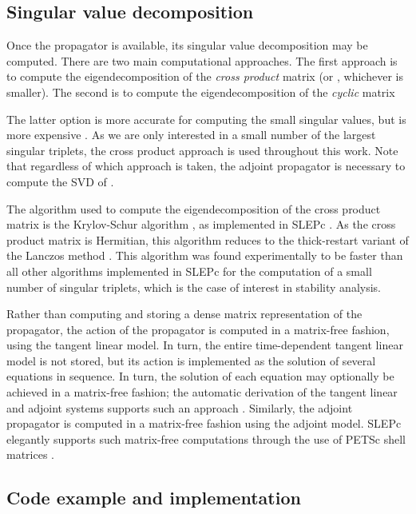 \documentclass{siamltex}
\begin{document}
\subsection{Singular value decomposition} \label{sec:svd}
Once the propagator  is available, its singular value decomposition may be computed. 
There are two main computational approaches. The first approach is to compute the eigendecomposition 
of the \emph{cross product} matrix  (or , whichever is smaller). The second is to
compute the eigendecomposition of the \emph{cyclic} matrix 

The latter option is more accurate for computing the
small singular values, but is more expensive \cite{trefethen1997}. As we are only interested in a small number of
the largest singular triplets, the cross product approach is used throughout this work. Note
that regardless of which approach is taken, the adjoint propagator  is necessary
to compute the SVD of .

The algorithm used to compute the eigendecomposition of the cross product matrix is the Krylov-Schur algorithm
\cite{stewart2001}, as
implemented in SLEPc \cite{hernandez2005,hernandez2007b}. As the cross product matrix is Hermitian, this
algorithm reduces to the thick-restart variant \cite{wu2000} of the Lanczos method \cite{lanczos1950}.  This algorithm was found experimentally to be
faster than all other algorithms implemented in SLEPc for the computation of a small number of singular triplets, which
is the case of interest in stability analysis.

Rather than computing and storing a dense matrix representation of the propagator, the action of the propagator is computed in a matrix-free
fashion, using the tangent linear model. In turn, the entire time-dependent tangent linear model is not
stored, but its action is implemented as the solution of several equations in sequence.
In turn, the solution of each equation may optionally be achieved in a matrix-free fashion; the automatic
derivation of the tangent linear and adjoint systems supports such an approach \cite{farrell2012b}.
Similarly, the adjoint propagator is computed in a matrix-free fashion using the adjoint model. SLEPc
elegantly supports such matrix-free computations through the use of PETSc shell matrices \cite{balay2010,balay1997}.


\subsection{Code example and implementation} \label{sec:code_example}
\end{document}
